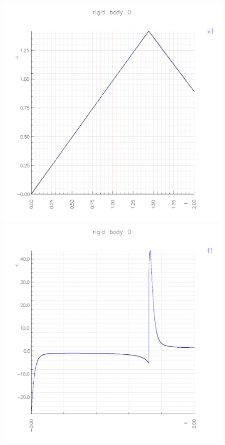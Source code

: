 {
\newcommand{\figWidth}{.45\linewidth}
\begin{figure}
\begin{center}
\includegraphics[width=\figWidth]{figures/collide5-rb-x1}  
\includegraphics[width=\figWidth]{figures/collide5-rb-f1}  

\end{center}
\end{figure}}
